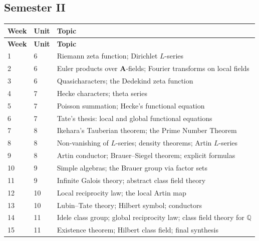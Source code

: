 \documentclass[11pt]{article}
\begin{document}
\subsection*{Semester II}
\begin{longtable}{@{}C{1.3cm} C{1.3cm} L{11cm}@{}}
\toprule
\textbf{Week} & \textbf{Unit} & \textbf{Topic} \\
\midrule
\endfirsthead
\toprule
\textbf{Week} & \textbf{Unit} & \textbf{Topic} \\
\midrule
{} & 6 & Riemann zeta function; Dirichlet $L$-series \\
2 & 6 & Euler products over \textbf{A}-fields; Fourier transforms on local fields \\
3 & 6 & Quasicharacters; the Dedekind zeta function \\
4 & 7 & Hecke characters; theta series \\
5 & 7 & Poisson summation; Hecke's functional equation \\
6 & 7 & Tate's thesis: local and global functional equations \\
7 & 8 & Ikehara's Tauberian theorem; the Prime Number Theorem \\
8 & 8 & Non-vanishing of $L$-series; density theorems; Artin $L$-series \\
9 & 8 & Artin conductor; Brauer--Siegel theorem; explicit formulas \\
10 & 9 & Simple algebras; the Brauer group via factor sets \\
11 & 9 & Infinite Galois theory; abstract class field theory \\
12 & 10 & Local reciprocity law; the local Artin map \\
13 & 10 & Lubin--Tate theory; Hilbert symbol; conductors \\
14 & 11 & Idele class group; global reciprocity law; class field theory for $\mathbb{Q}$ \\
15 & 11 & Existence theorem; Hilbert class field; final synthesis \\
\bottomrule
\end{longtable}

\end{document}
